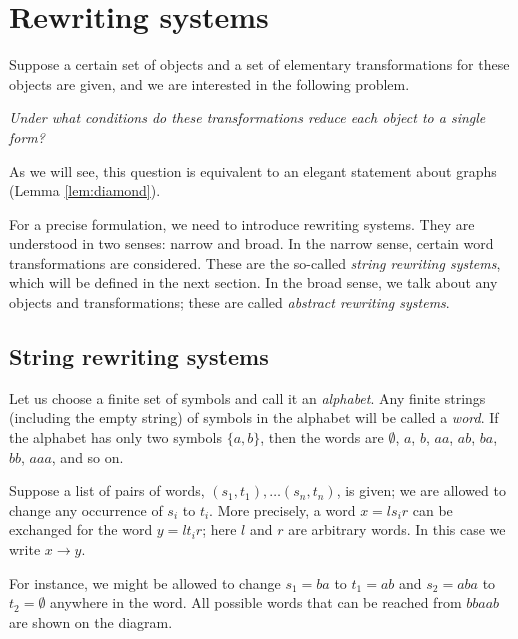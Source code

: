 \chapter{Rewriting systems}


Suppose a certain set of objects and a set of elementary transformations for these objects are given, and we are interested in the following problem.

\textit{Under what conditions do these transformations reduce each object to a single form?}

As we will see, this question is equivalent to an elegant statement about graphs (Lemma \ref{lem:diamond}).

For a precise formulation, we need to introduce rewriting systems.
They are understood in two senses: narrow and broad.
In the narrow sense, certain word transformations are considered.
These are the so-called \textit{string rewriting systems}, which will be defined in the next section.
In the broad sense, we talk about any objects and transformations; these are called \textit{abstract rewriting systems}.

\section{String rewriting systems}

Let us choose a finite set of symbols and call it an \emph{alphabet}.
Any finite strings (including the empty string) of symbols in the alphabet will be called a \emph{word}.
If the alphabet has only two symbols $\{a,b\}$, then the words are 
$\emptyset$, $a$, $b$, $aa$, $ab$, $ba$, $bb$, $aaa$, and so on.

Suppose a list of pairs of words, $(s_1,t_1),\dots (s_n,t_n)$, is given;
we are allowed to change any occurrence of $s_i$ to $t_i$.
More precisely, a word $x=ls_ir$ can be exchanged for the word $y=lt_ir$;
here $l$ and $r$ are arbitrary words.
In this case we write $x\to y$.

For instance, we might be allowed to change $s_1=ba$ to $t_1=ab$ and $s_2=aba$ to $t_2=\emptyset$ anywhere in the word.
All possible words that can be reached from $bbaab$ are shown on the diagram.

